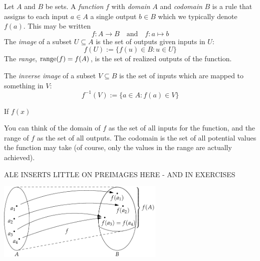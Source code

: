 \begin{defn}{}{}
	Let $A$ and $B$ be sets. A \emph{function} $f$ with \emph{domain} $A$ and \emph{codomain} $B$ is a rule that assigns to each input $a\in A$ a single output $b\in B$ which we typically denote $f(a)$. This may be written
	\[
		f:A\to B\quad\text{and}\quad f:a\mapsto b \tag{different arrows for sets vs. elements!}
	\]
	The \emph{image} of a subset $U\subseteq A$ is the set of outputs given inputs in $U$:
	\[
		f(U):=\bigl\{f(u)\in B:u\in U\bigr\}
	\]
	The \emph{range}, $\operatorname{range}(f)=f(A)$, is the set of realized outputs of the function.\par
	The \emph{inverse image} of a subset $V\subseteq B$ is the set of inputs which are mapped to something in $V$:
	\[
		f^{-1}(V):=\bigl\{a\in A:f(a)\in V\bigr\}
	\] 
\end{defn}

\begin{example}{}{}
	If $f(x)$
\end{example}

 You can think of the domain of $f$ as the set of all inputs for the function, and the range of $f$ as the set of all outputs. The codomain is the set of all potential values the function may take (of course, only the values in the range are actually achieved).

ALE INSERTS LITTLE ON PREIMAGES HERE - AND IN EXERCISES


\begin{center}
\includegraphics[width=0.6\textwidth]{sets-16-funcdef}
\end{center}



